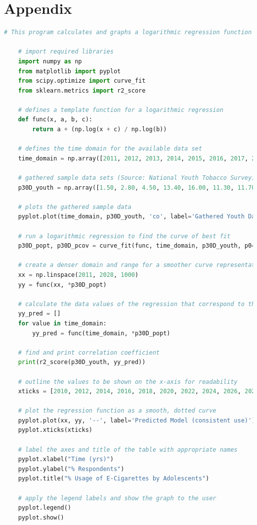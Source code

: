 \section*{Appendix}

\begin{lstlisting}[language=python,breaklines=true]
    # This program calculates and graphs a logarithmic regression function for a vector that includes data relating to the consumption of nicotine via e-cigarettes for adolescents

    # import required libraries
    import numpy as np
    from matplotlib import pyplot
    from scipy.optimize import curve_fit
    from sklearn.metrics import r2_score
    
    # defines a template function for a logarithmic regression
    def func(x, a, b, c):
        return a + (np.log(x + c) / np.log(b))
    
    # defines the time domain for the available data set
    time_domain = np.array([2011, 2012, 2013, 2014, 2015, 2016, 2017, 2018])
    
    # gathered sample data sets (Source: National Youth Tobacco Survey)
    p30D_youth = np.array([1.50, 2.80, 4.50, 13.40, 16.00, 11.30, 11.70, 20.8])
    
    # plots the gathered sample data
    pyplot.plot(time_domain, p30D_youth, 'co', label='Gathered Youth Data (consistent use)')
    
    # run a logarithmic regression to find the curve of best fit
    p30D_popt, p30D_pcov = curve_fit(func, time_domain, p30D_youth, p0=(-30, 1.1, 5))
    
    # create a denser domain and range for a smoother curve representation
    xx = np.linspace(2011, 2028, 1000)
    yy = func(xx, *p30D_popt)
    
    # calculate the data values of the regression that correspond to the sample data
    yy_pred = []
    for value in time_domain:
        yy_pred = func(time_domain, *p30D_popt)
    
    # find and print correlation coefficient
    print(r2_score(p30D_youth, yy_pred))
    
    # outline the values to be shown on the x-axis for readability
    xticks = [2010, 2012, 2014, 2016, 2018, 2020, 2022, 2024, 2026, 2028]
    
    # plot the regression function as a smooth, dotted curve
    pyplot.plot(xx, yy, '--', label='Predicted Model (consistent use)')
    pyplot.xticks(xticks)
    
    # label the axes and title of the table with appropriate names
    pyplot.xlabel("Time (yrs)")
    pyplot.ylabel("% Respondents")
    pyplot.title("% Usage of E-Cigarettes by Adolescents")
    
    # apply the legend labels and show the graph to the user
    pyplot.legend()
    pyplot.show()    
\end{lstlisting}

\setcounter{section}{0}
